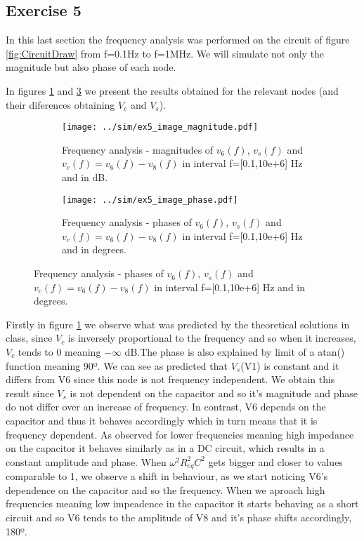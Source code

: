 \subsection{Exercise 5} \label{sec:Ex5Sim}

In this last section the frequency analysis was performed on the circuit of figure \ref{fig:CircuitDraw} from f=0.1Hz to f=1MHz. We will simulate not only the magnitude but also phase of each node.
\par
\vspace{20mm}


In figures \ref{fig:Ex5_Image_Magnitude} and \ref{fig:Ex5_Image_Phase} we present the results obtained for the relevant nodes (and their diferences obtaining $V_c$ and $V_s$).

\vspace{-30mm}

 \begin{figure}[H]
\begin{subfigure}{.49\linewidth}
  \centering
  \texttt{[image: ../sim/ex5\_image\_magnitude.pdf]}
   \footnotesize
\caption{Frequency analysis - magnitudes of $v_6(f)$, $v_s(f)$ and $v_c(f)=v_6(f)-v_8(f)$ in interval f=[0.1,10e+6] Hz and in dB.}
\label{fig:Ex5_Image_Magnitude}
\end{subfigure}
\hspace{5mm}
\begin{subfigure}{.49\linewidth}
  \centering
  \texttt{[image: ../sim/ex5\_image\_phase.pdf]}  
\caption{Frequency analysis - phases of $v_6(f)$, $v_s(f)$ and $v_c(f)=v_6(f)-v_8(f)$ in interval f=[0.1,10e+6] Hz and in degrees.}
\label{fig:Ex5_Image_Phase}
\end{subfigure}
 \end{figure}
 
Firstly in figure \ref{fig:Ex5_Image_Magnitude} we observe what was predicted by the theoretical solutions in class, since $V_c$ is inversely proportional to the frequency and so when it increases, $V_c$  tends to 0 meaning $-\infty$ dB.The phase is also explained by limit of a atan() function meaning 90º. We can see as predicted that $V_s$(V1) is constant and it differs from V6 since this node is not frequency independent. We obtain this result since $V_s$ is not dependent on the capacitor and so it's magnitude and phase do not differ over an increase of frequency. In contrast, V6 depends on the capacitor and thus it behaves accordingly which in turn means that it is frequency dependent. As observed for lower frequencies meaning high impedance on the capacitor it behaves similarly as in a DC circuit, which results in a constant amplitude and phase. When $\omega^2R_{eq}^2C^2$ gets bigger and closer to values comparable to 1, we observe a shift in behaviour, as we start noticing V6's dependence on the capacitor and so the frequency. When we aproach high frequencies meaning low impeadence in the capacitor it starts behaving as a short circuit and so V6 tends to the amplitude of V8 and it's phase shifts accordingly, 180º.   
